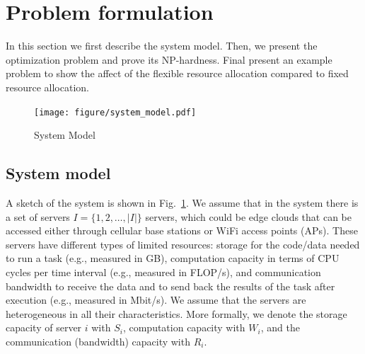 \section{Problem formulation}\label{sec:system-model}
In this section we first describe the system model. Then, we present the optimization problem and prove its NP-hardness.
Final present an example problem to show the affect of the flexible resource allocation compared to fixed resource
allocation.

\begin{figure}[ht]
    \centering
    \texttt{[image: figure/system\_model.pdf]}
    \caption{System Model}
    \label{fig:system_model}
\end{figure}

\subsection{System model}
A sketch of the system is shown in Fig.~\ref{fig:system_model}.
We assume that in the system there is a set of servers $I = \{1,2,\ldots,\left|I\right|\}$ servers, which could be edge
clouds that can be accessed either through cellular base stations or WiFi access points (APs). These servers have
different types of limited resources: storage for the code/data needed to run a task (e.g., measured in GB),
computation capacity in terms of CPU cycles per time interval (e.g., measured in FLOP/s), and communication bandwidth
to receive the data and to send back the results of the task after execution (e.g., measured in Mbit/s). We assume
that the servers are heterogeneous in all their characteristics. More formally, we denote the storage capacity of
server $i$ with $S_i$, computation capacity with $W_i$, and the communication (bandwidth) capacity with $R_i$.

